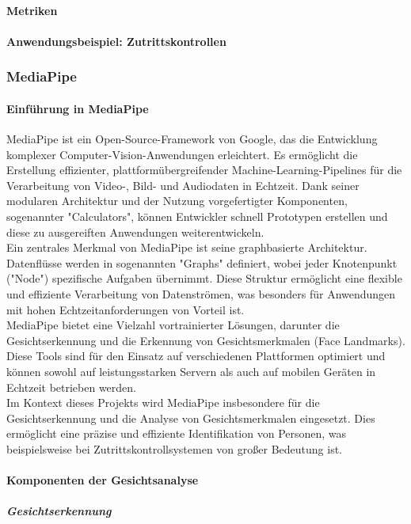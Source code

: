 \paragraph{Metriken}
\paragraph{Anwendungsbeispiel: Zutrittskontrollen}

\subsubsection{MediaPipe}
\paragraph{Einführung in MediaPipe}
MediaPipe ist ein Open-Source-Framework von Google, das die Entwicklung komplexer Computer-Vision-Anwendungen erleichtert. Es ermöglicht die Erstellung effizienter, plattformübergreifender Machine-Learning-Pipelines für die Verarbeitung von Video-, Bild- und Audiodaten in Echtzeit. Dank seiner modularen Architektur und der Nutzung vorgefertigter Komponenten, sogenannter "Calculators", können Entwickler schnell Prototypen erstellen und diese zu ausgereiften Anwendungen weiterentwickeln.  \\
Ein zentrales Merkmal von MediaPipe ist seine graphbasierte Architektur. Datenflüsse werden in sogenannten "Graphs" definiert, wobei jeder Knotenpunkt ("Node") spezifische Aufgaben übernimmt. Diese Struktur ermöglicht eine flexible und effiziente Verarbeitung von Datenströmen, was besonders für Anwendungen mit hohen Echtzeitanforderungen von Vorteil ist.  \\
MediaPipe bietet eine Vielzahl vortrainierter Lösungen, darunter die Gesichtserkennung und die Erkennung von Gesichtsmerkmalen (Face Landmarks). Diese Tools sind für den Einsatz auf verschiedenen Plattformen optimiert und können sowohl auf leistungsstarken Servern als auch auf mobilen Geräten in Echtzeit betrieben werden. \\
Im Kontext dieses Projekts wird MediaPipe insbesondere für die Gesichtserkennung und die Analyse von Gesichtsmerkmalen eingesetzt. Dies ermöglicht eine präzise und effiziente Identifikation von Personen, was beispielsweise bei Zutrittskontrollsystemen von großer Bedeutung ist.\\

\paragraph{Komponenten der Gesichtsanalyse}
\subparagraph{Gesichtserkennung}

